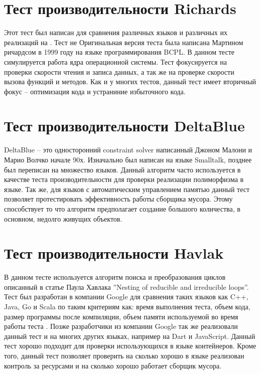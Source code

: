 \section{Тест производительности Richards}

Этот тест был написан для сравнения различных языков и различных их реализаций на . Тест не
Оригинальная версия теста была написана Мартином ричардсом в 1999 году на языке программирования BCPL. В данном тесте симулируется работа ядра операционной системы.
Тест фокусируется на проверки скорости чтения и записа данных, а так же на проверке скорости вызова функций и методов. Как и у многих тестов, данный тест имеет вторичный фокус -- оптимизация кода и устраниние избыточного кода.
\cite{Richards}

\section{Тест производительности DeltaBlue}

DeltaBlue -- это односторонний constraint solver написанный Джоном Малони и Марио Волчко начале 90х. Изначально был написан на языке Smalltalk, позднее был переписан на множество языков. Данный алгоритм часто используется в качестве теста производительности для проверки реализации полиморфизма в языке. Так же, для языков с автоматическим управлением памятью данный тест позволяет протестировать эффективность работы сборщика мусора. Этому способствует то что алгоритм предполагает создание большого количества, в основном, недолго живущих объектов.
\cite{DeltaBlueST, DeltaBlue, DeltaBlue2}

\section{Тест производительности Havlak}

В данном тесте используется алгоритм поиска и преобразования циклов описанный в статье Паула Хавлака ”Nesting of reducible and irreducible
loops”. \cite{Havlak} Тест был разработан в компании Google для сравнения таких языков как C++, Java, Go и Scala по таким критериям как: время выполнения теста, объем кода, размер программы после компиляции, объем памяти используемой во время работы теста \cite{HavlakBench}. Позже разработчики из компании Google так же реализовали данный тест и на многих других языках, например на Dart и JavaScript. Данный тест хорошо подходит для проверки использующихся в языке контейнеров. Кроме того, данный тест позволяет проверить на сколько хорошо в языке реализован контроль за ресурсами и на сколько хорошо работает сборщик мусора.

